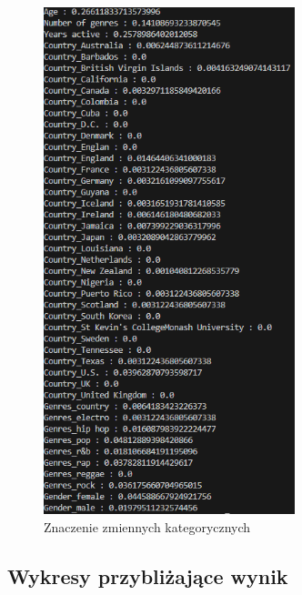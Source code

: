 \documentclass[12pt, letterpaper]{article}
\begin{document}
\begin{figure}[h]
    \centering
    \includegraphics[width=0.65\textwidth]{importances_details}  
    \caption{Znaczenie zmiennych kategorycznych}
\end{figure}

\subsection{Wykresy przybliżające wynik}
\end{document}
